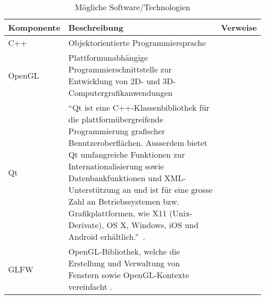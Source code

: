 \begin{longtabu}{p{0.2\textwidth}p{0.7\textwidth}p{0.1\textwidth}}
    \caption{Mögliche
        Software/Technologien}\label{table:requirements:additional-requirements:software}\\
    \toprule
    \textbf{Komponente} & \textbf{Beschreibung} & \textbf{Verweise} \\
    \midrule
    C++        & Objektorientierte Programmiersprache
                           & \protect\footnotemark{}\\

    OpenGL     & Plattformunabhängige Programmierschnittstelle zur
                           Entwicklung von 2D- und 3D-Computergrafikanwendungen
                           \parencite{wikipedia_the_free_encyclopedia_opengl_2015}
                           &\protect\footnotemark{}\\

    Qt        & ``Qt ist eine C++-Klassenbibliothek für die
                           plattformübergreifende Programmierung grafischer
                           Benutzeroberflächen. Ausserdem bietet Qt
                           umfangreiche Funktionen zur Internationalisierung
                           sowie Datenbankfunktionen und XML-Unterstützung an
                           und ist für eine grosse Zahl an Betriebssystemen bzw.
                           Grafikplattformen, wie X11 (Unix-Derivate), OS X,
                           Windows, iOS und Android
                           erhältlich.''~\parencite{wikipedia_foundation_qt_2016}.
                           &\protect\footnotemark{}\\

    GLFW       & OpenGL-Bibliothek, welche die Erstellung und
                           Verwaltung von Fenstern sowie OpenGL-Kontexte
                           vereinfacht
                           \parencite{wikipedia_the_free_encyclopedia_glfw_2015}.
                           &\protect\footnotemark{}\\


\end{longtabu}
